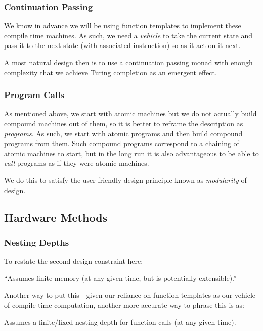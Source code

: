 \documentclass[twoside]{article}
\begin{document}
\subsubsection*{Continuation Passing}

We know in advance we will be using function templates to implement these compile time machines.
As such, we need a \emph{vehicle} to take the current state and pass it to the next state
(with associated instruction) so as it act on it next.

A most natural design then is to use a continuation passing monad with enough complexity that we achieve Turing
completion as an emergent effect.

\subsubsection*{Program Calls}

As mentioned above, we start with atomic machines but we do not actually build compound machines out of them,
so it is better to reframe the description as \emph{programs}. As such, we start with atomic programs and then
build compound programs from them. Such compound programs correspond to a chaining of atomic machines to start,
but in the long run it is also advantageous to be able to \emph{call} programs as if they were atomic machines.

We do this to satisfy the user-friendly design principle known as \emph{modularity} of design.

\subsection*{Hardware Methods}

\subsubsection*{Nesting Depths}

To restate the second design constraint here:

\begin{center}
``Assumes finite memory (at any given time, but is potentially extensible).''
\end{center}

Another way to put this---given our reliance on function templates as our vehicle of compile time computation,
another more accurate way to phrase this is as:

\begin{center}
Assumes a finite/fixed nesting depth for function calls (at any given time).
\end{center}
\end{document}
